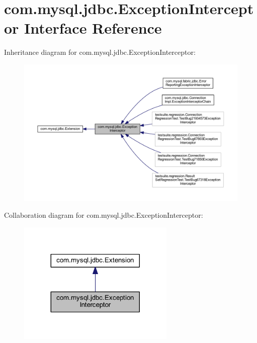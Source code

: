 \hypertarget{interfacecom_1_1mysql_1_1jdbc_1_1_exception_interceptor}{}\section{com.\+mysql.\+jdbc.\+Exception\+Interceptor Interface Reference}
\label{interfacecom_1_1mysql_1_1jdbc_1_1_exception_interceptor}


Inheritance diagram for com.\+mysql.\+jdbc.\+Exception\+Interceptor\+:
\nopagebreak
\begin{figure}[H]
\begin{center}
\leavevmode
\includegraphics[width=350pt]{interfacecom_1_1mysql_1_1jdbc_1_1_exception_interceptor__inherit__graph}
\end{center}
\end{figure}


Collaboration diagram for com.\+mysql.\+jdbc.\+Exception\+Interceptor\+:
\nopagebreak
\begin{figure}[H]
\begin{center}
\leavevmode
\includegraphics[width=212pt]{interfacecom_1_1mysql_1_1jdbc_1_1_exception_interceptor__coll__graph}
\end{center}
\end{figure}
